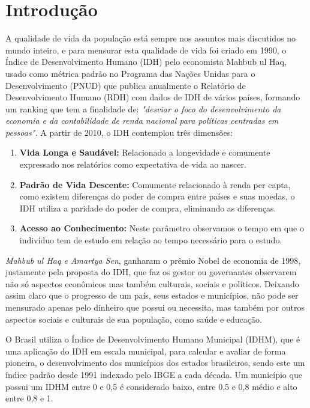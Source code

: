 \documentclass[journal]{IEEEtran}
\begin{document}
\section{Introdução}
A qualidade de vida da população está sempre nos assuntos mais discutidos no mundo inteiro, e para mensurar esta qualidade de vida foi criado em 1990, o Índice de Desenvolvimento Humano (IDH) pelo economista Mahbub ul Haq\cite{PNUD2017}\cite{Licia2009}\cite{loureiroimpacto}, usado como métrica padrão no Programa das Nações Unidas para o Desenvolvimento (PNUD) que publica anualmente o Relatório de Desenvolvimento Humano (RDH) com dados de IDH de vários países, formando um ranking\cite{PNUD2017} que tem a finalidade de: \emph{"desviar o foco do desenvolvimento da economia e da contabilidade de renda nacional para políticas centradas em pessoas\cite{Haq1995}".}
A partir de 2010, o IDH contemplou três dimensões\cite{Atlas2017}\cite{Licia2009}:

\begin{enumerate}
\item  {\textbf{Vida Longa e Saudável:} Relacionado a longevidade e comumente expressado nos relatórios como expectativa de vida ao nascer.}
\item  {\textbf{Padrão de Vida Descente:} Comumente relacionado à renda per capta, como existem diferenças do poder de compra entre países e suas moedas, o IDH utiliza a paridade do poder de compra, eliminando as diferenças.\cite{Licia2009}}
\item  {\textbf{Acesso ao Conhecimento:} Neste parâmetro observamos o tempo em que o indivíduo tem de estudo em relação ao tempo necessário para o estudo.}
\end{enumerate}

\emph{Mahbub ul Haq e Amartya Sen}, ganharam o prêmio Nobel de economia de 1998\cite{Licia2009}\cite{PNUD2017}, justamente pela proposta do IDH, que faz os gestor ou governantes observarem não só aspectos econômicos mas também culturais, sociais e políticos. Deixando assim claro que o progresso de um país, seus estados e municípios, não pode ser mensurado apenas pelo dinheiro que possui ou necessita, mas também por outros aspectos sociais e culturais de sua população, como saúde e educação.

O Brasil utiliza o Índice de Desenvolvimento Humano Municipal (IDHM), que é uma aplicação do IDH em escala municipal, para calcular e avaliar de forma pioneira, o desenvolvimento dos municípios dos estados brasileiros, sendo este um índice padrão desde 1991 indexado pelo IBGE a cada década. Um município que possui um IDHM entre 0 e 0,5 é considerado baixo, entre 0,5 e 0,8 médio e alto entre 0,8 e 1.\cite{IBGE2017}\cite{Atlas2017}
\end{document}
